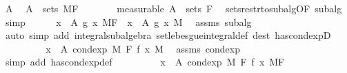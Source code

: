 \begin{isabellebody}
\ A\ \isamarkupfalse%
\ {\isachardoublequoteopen}A\ {\isasymin}\ sets\ {\isacharquery}{\kern0pt}MF{\isachardoublequoteclose}\isanewline
\ \ \ \ \isamarkupfalse%
\ \isamarkupfalse%
\ {\isacharbrackleft}{\kern0pt}measurable{\isacharbrackright}{\kern0pt}{\isacharcolon}{\kern0pt}\ {\isachardoublequoteopen}A\ {\isasymin}\ sets\ F{\isachardoublequoteclose}\ \isamarkupfalse%
\ sets{\isacharunderscore}{\kern0pt}restr{\isacharunderscore}{\kern0pt}to{\isacharunderscore}{\kern0pt}subalg{\isacharbrackleft}{\kern0pt}OF\ subalg{\isacharbrackright}{\kern0pt}\ \isamarkupfalse%
\ simp\isanewline
\ \ \ \ \isamarkupfalse%
\ {\isachardoublequoteopen}{\isacharparenleft}{\kern0pt}{\isasymintegral}x\ {\isasymin}\ A{\isachardot}{\kern0pt}\ g\ x\ {\isasympartial}{\isacharquery}{\kern0pt}MF{\isacharparenright}{\kern0pt}\ {\isacharequal}{\kern0pt}\ {\isacharparenleft}{\kern0pt}{\isasymintegral}x\ {\isasymin}\ A{\isachardot}{\kern0pt}\ g\ x\ {\isasympartial}M{\isacharparenright}{\kern0pt}{\isachardoublequoteclose}\ \isamarkupfalse%
\ assms\ subalg\ \isamarkupfalse%
\ {\isacharparenleft}{\kern0pt}auto\ simp\ add{\isacharcolon}{\kern0pt}\ integral{\isacharunderscore}{\kern0pt}subalgebra{}\ set{\isacharunderscore}{\kern0pt}lebesgue{\isacharunderscore}{\kern0pt}integral{\isacharunderscore}{\kern0pt}def\ dest{\isacharbang}{\kern0pt}{\isacharcolon}{\kern0pt}\ has{\isacharunderscore}{\kern0pt}cond{\isacharunderscore}{\kern0pt}expD{\isacharparenright}{\kern0pt}\isanewline
\ \ \ \ \isamarkupfalse%
\ \isamarkupfalse%
\ {\isachardoublequoteopen}{\isachardot}{\kern0pt}{\isachardot}{\kern0pt}{\isachardot}{\kern0pt}\ {\isacharequal}{\kern0pt}\ {\isacharparenleft}{\kern0pt}{\isasymintegral}x\ {\isasymin}\ A{\isachardot}{\kern0pt}\ cond{\isacharunderscore}{\kern0pt}exp\ M\ F\ f\ x\ {\isasympartial}M{\isacharparenright}{\kern0pt}{\isachardoublequoteclose}\ \isamarkupfalse%
\ assms\ cond{\isacharunderscore}{\kern0pt}exp\ \isamarkupfalse%
\ {\isacharparenleft}{\kern0pt}simp\ add{\isacharcolon}{\kern0pt}\ has{\isacharunderscore}{\kern0pt}cond{\isacharunderscore}{\kern0pt}exp{\isacharunderscore}{\kern0pt}def{\isacharparenright}{\kern0pt}\isanewline
\ \ \ \ \isamarkupfalse%
\ \isamarkupfalse%
\ {\isachardoublequoteopen}{\isachardot}{\kern0pt}{\isachardot}{\kern0pt}{\isachardot}{\kern0pt}\ {\isacharequal}{\kern0pt}\ {\isacharparenleft}{\kern0pt}{\isasymintegral}x\ {\isasymin}\ A{\isachardot}{\kern0pt}\ cond{\isacharunderscore}{\kern0pt}exp\ M\ F\ f\ x\ {\isasympartial}{\isacharquery}{\kern0pt}MF{\isacharparenright}{\kern0pt}{\isachardoublequoteclose}\ \isamarkupfalse%

\end{isabellebody}

